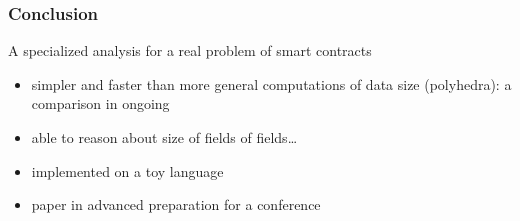 \documentclass[11pt]{beamer}  %
\begin{document}
\begin{frame}\frametitle{Conclusion}

  A specialized analysis for a real problem of smart contracts
  \begin{itemize}
  \item simpler and faster than more general computations of data size
    (polyhedra): a comparison in ongoing
  \item able to reason about size of fields of fields\ldots
  \item implemented on a toy language
  \item paper in advanced preparation for a conference
  \end{itemize}
\end{frame}
\end{document}
